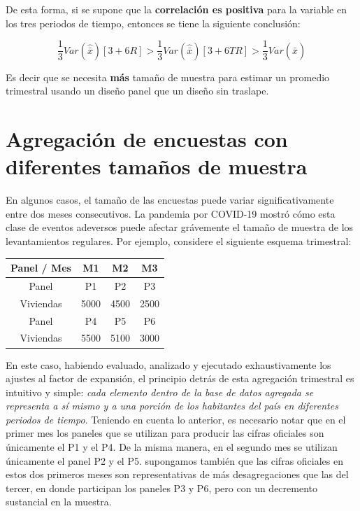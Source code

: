 \documentclass[
  10pt,
  spanish,
]{book}
\begin{document}
De esta forma, si se supone que la \textbf{correlación es positiva} para la
variable en los tres periodos de tiempo, entonces se tiene la siguiente
conclusión:

\[
\frac{1}{3} Var(\hat{\bar{x}}) [3+6R] > \frac{1}{3} Var(\hat{\bar{x}}) [3+6TR] > \frac{1}{3} Var(\hat{\bar{x}})
\]

Es decir que se necesita \textbf{más} tamaño de muestra para estimar un
promedio trimestral usando un diseño panel que un diseño sin traslape.

\hypertarget{agregaciuxf3n-de-encuestas-con-diferentes-tamauxf1os-de-muestra}{%
\section{Agregación de encuestas con diferentes tamaños de muestra}\label{agregaciuxf3n-de-encuestas-con-diferentes-tamauxf1os-de-muestra}}

En algunos casos, el tamaño de las encuestas puede variar significativamente entre dos meses consecutivos. La pandemia por COVID-19 mostró cómo esta clase de eventos adeversos puede afectar grávemente el tamaño de muestra de los levantamientos regulares. Por ejemplo, considere el siguiente esquema trimestral:

\begin{longtable}[]{@{}cccc@{}}
\toprule
Panel / Mes & M1 & M2 & M3 \\
\midrule
\endhead
Panel & P1 & P2 & P3 \\
Viviendas & 5000 & 4500 & 2500 \\
Panel & P4 & P5 & P6 \\
Viviendas & 5500 & 5100 & 3000 \\
\bottomrule
\end{longtable}

En este caso, habiendo evaluado, analizado y ejecutado exhaustivamente los ajustes al factor de expansión, el principio detrás de esta agregación trimestral es intuitivo y simple: \emph{cada elemento dentro de la base de datos agregada se
representa a sí mismo y a una porción de los habitantes del país en
diferentes periodos de tiempo}. Teniendo en cuenta lo anterior, es
necesario notar que en el primer mes los paneles que se utilizan para
producir las cifras oficiales son únicamente el P1 y el P4. De la misma
manera, en el segundo mes se utilizan únicamente el panel P2 y el P5. supongamos también que las cifras oficiales en estos dos primeros meses son representativas de más desagregaciones que las del tercer, en donde participan los paneles P3 y P6, pero con un decremento sustancial en la muestra.
\end{document}
